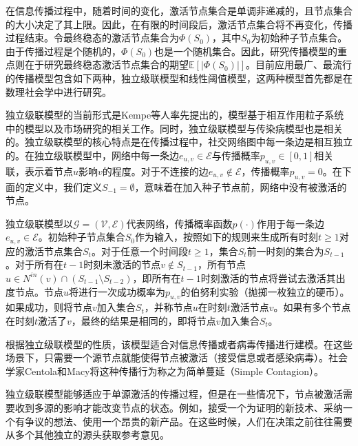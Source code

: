 在信息传播过程中，随着时间的变化，激活节点集合是单调非递减的，且节点集合的大小决定了其上限。因此，在有限的时间段后，激活节点集合将不再变化，传播过程结束。令最终稳态的激活节点集合为$\Phi \left(S_0\right)$，其中$S_0$为初始种子节点集合。由于传播过程是个随机的，$\Phi \left(S_0\right)$也是一个随机集合。因此，研究传播模型的重点则在于研究最终稳态激活节点集合的期望$\mathbb{E} \left[ | \Phi \left(S_0\right) | \right]$。目前应用最广、最流行的传播模型包含如下两种，独立级联模型和线性阈值模型，这两种模型首先都是在数理社会学中进行研究。

独立级联模型的当前形式是Kempe等人率先提出的，模型基于相互作用粒子系统中的模型以及市场研究的相关工作。同时，独立级联模型与传染病模型也是相关的。独立级联模型的核心特点是在传播过程中，社交网络图中每一条边是相互独立的。在独立级联模型中，网络中每一条边$e_{u,v} \in \mathcal{E}$与传播概率$p_{u,v} \in \left[0,1\right]$相关联，表示着节点$u$影响$v$的程度。对于不连接的边$e_{u,v} \notin \mathcal{E}$，传播概率$p_{u,v} = 0$。在下面的定义中，我们定义$S_{-1} = \emptyset$，意味着在加入种子节点前，网络中没有被激活的节点。

\begin{defn}[独立级联模型]
\label{def:icModel}
独立级联模型以$\mathcal{G} = \left(\mathcal{V}, \mathcal{E}\right)$代表网络，传播概率函数$p\left( \cdot \right)$作用于每一条边$e_{u,v} \in \mathcal{E}$。初始种子节点集合$S_0$作为输入，按照如下的规则来生成所有时刻$t \geq 1$对应的激活节点集合$S_t$。对于任意一个时间段$t \geq 1$，集合$S_t$前一时刻的集合为$S_{t-1}$。对于所有在$t-1$时刻未激活的节点$v \notin S_{t-1}$，所有节点$u \in N^{in}\left(v\right) \cap \left(S_{t-1} \setminus S_{t-2} \right)$，即所有在$t-1$时刻激活的节点将尝试去激活其出度节点。节点$u$将进行一次成功概率为$p_{u,v}$的伯努利实验（抛掷一枚独立的硬币）。如果成功，则将节点$v$加入集合$S_t$，并称节点$u$在时刻$t$激活节点$v$。如果有多个节点在时刻$t$激活了$v$，最终的结果是相同的，即将节点$v$加入集合$S_t$。
\end{defn}

根据独立级联模型的性质，该模型适合对信息传播或者病毒传播进行建模。在这些场景下，只需要一个源节点就能使得节点被激活（接受信息或者感染病毒）。社会学家Centola和Macy将这种传播行为称之为简单蔓延（Simple Contagion）。

独立级联模型能够适应于单源激活的传播过程，但是在一些情况下，节点被激活需要收到多源的影响才能改变节点的状态。例如，接受一个为证明的新技术、采纳一个有争议的想法、使用一个昂贵的新产品。在这些时候，人们在决策之前往往需要从多个其他独立的源头获取参考意见。

